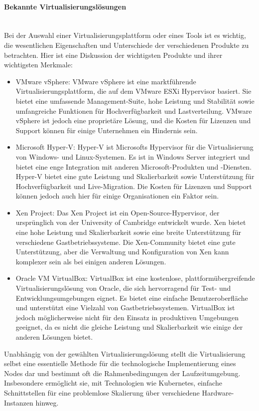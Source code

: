 \documentclass[../vs-script-first-v01.tex]{subfiles}
\begin{document}
\paragraph{Bekannte Virtualisierungslösungen\\\\}
Bei der Auswahl einer Virtualisierungsplattform oder eines Tools ist es wichtig, die wesentlichen Eigenschaften und Unterschiede der verschiedenen Produkte zu betrachten. Hier ist eine Diskussion der wichtigsten Produkte und ihrer wichtigsten Merkmale:
\begin{itemize}
\item VMware vSphere: VMware vSphere ist eine marktführende Virtualisierungsplattform, die auf dem VMware ESXi Hypervisor basiert. Sie bietet eine umfassende Management-Suite, hohe Leistung und Stabilität sowie umfangreiche Funktionen für Hochverfügbarkeit und Lastverteilung. VMware vSphere ist jedoch eine proprietäre Lösung, und die Kosten für Lizenzen und Support können für einige Unternehmen ein Hindernis sein.
\item Microsoft Hyper-V: Hyper-V ist Microsofts Hypervisor für die Virtualisierung von Windows- und Linux-Systemen. Es ist in Windows Server integriert und bietet eine enge Integration mit anderen Microsoft-Produkten und -Diensten. Hyper-V bietet eine gute Leistung und Skalierbarkeit sowie Unterstützung für Hochverfügbarkeit und Live-Migration. Die Kosten für Lizenzen und Support können jedoch auch hier für einige Organisationen ein Faktor sein.
\item Xen Project: Das Xen Project ist ein Open-Source-Hypervisor, der ursprünglich von der University of Cambridge entwickelt wurde. Xen bietet eine hohe Leistung und Skalierbarkeit sowie eine breite Unterstützung für verschiedene Gastbetriebssysteme. Die Xen-Community bietet eine gute Unterstützung, aber die Verwaltung und Konfiguration von Xen kann komplexer sein als bei einigen anderen Lösungen.
\item Oracle VM VirtualBox: VirtualBox ist eine kostenlose, plattformübergreifende Virtualisierungslösung von Oracle, die sich hervorragend für Test- und Entwicklungsumgebungen eignet. Es bietet eine einfache Benutzeroberfläche und unterstützt eine Vielzahl von Gastbetriebssystemen. VirtualBox ist jedoch möglicherweise nicht für den Einsatz in produktiven Umgebungen geeignet, da es nicht die gleiche Leistung und Skalierbarkeit wie einige der anderen Lösungen bietet.
\end{itemize}

Unabhängig von der gewählten Virtualisierungslösung stellt die Virtualisierung selbst eine essentielle Methode für die technologische Implementierung eines Nodes dar und bestimmt oft die Rahmenbedingungen der Laufzeitumgebung. Insbesondere ermöglicht sie, mit Technologien wie Kubernetes, einfache Schnittstellen für eine problemlose Skalierung über verschiedene Hardware-Instanzen hinweg.
\end{document}
